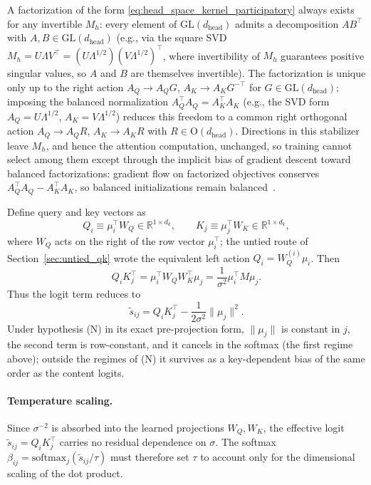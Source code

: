 A factorization of the form \eqref{eq:head_space_kernel_participatory} always exists for any invertible $M_h$: every element of $\mathrm{GL}(d_{\text{head}})$ admits a decomposition $A B^\top$ with $A, B \in \mathrm{GL}(d_{\text{head}})$ (e.g., via the square SVD $M_h = U\Lambda V^\top = (U\Lambda^{1/2})(V\Lambda^{1/2})^\top$, where invertibility of $M_h$ guarantees positive singular values, so $A$ and $B$ are themselves invertible). The factorization is unique only up to the right action $A_Q \to A_Q G$, $A_K \to A_K G^{-\top}$ for $G \in \mathrm{GL}(d_{\text{head}})$; imposing the balanced normalization $A_Q^\top A_Q = A_K^\top A_K$ (e.g., the SVD form $A_Q = U\Lambda^{1/2}$, $A_K = V\Lambda^{1/2}$) reduces this freedom to a common right orthogonal action $A_Q \to A_Q R$, $A_K \to A_K R$ with $R \in \mathrm{O}(d_{\text{head}})$. Directions in this stabilizer leave $M_h$, and hence the attention computation, unchanged, so training cannot select among them except through the implicit bias of gradient descent toward balanced factorizations: gradient flow on factorized objectives conserves $A_Q^\top A_Q - A_K^\top A_K$, so balanced initializations remain balanced~\cite{du2018balanced, arora2018implicit}.

Define query and key vectors as
\begin{equation}
Q_i \equiv \mu_i^\top W_Q \in \mathbb{R}^{1\times d_k}, \qquad K_j \equiv \mu_j^\top W_K \in \mathbb{R}^{1\times d_k},
\end{equation}
where $W_Q$ acts on the right of the row vector $\mu_i^\top$; the untied route of Section~\ref{sec:untied_qk} wrote the equivalent left action $Q_i = W_Q^{(i)}\mu_i$. Then
\begin{equation}
Q_i K_j^\top = \mu_i^\top W_Q W_K^\top \mu_j = \frac{1}{\sigma^2}\mu_i^\top M \mu_j.
\end{equation}
Thus the logit term reduces to
\begin{equation}
\tilde{s}_{ij} = Q_i K_j^\top - \frac{1}{2\sigma^2}\|\mu_j\|^2.
\end{equation}
Under hypothesis (N) in its exact pre-projection form, $\|\mu_j\|$ is constant in $j$, the second term is row-constant, and it cancels in the softmax (the first regime above); outside the regimes of (N) it survives as a key-dependent bias of the same order as the content logits.

\paragraph{Temperature scaling.}
Since $\sigma^{-2}$ is absorbed into the learned projections $W_Q, W_K$, the effective logit $\tilde{s}_{ij} = Q_i K_j^\top$ carries no residual dependence on $\sigma$. The softmax $\beta_{ij} = \mathrm{softmax}_j(\tilde{s}_{ij}/\tau)$ must therefore set $\tau$ to account only for the dimensional scaling of the dot product.

